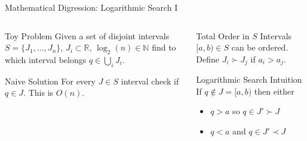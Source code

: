 \documentclass[xetex]{beamer}
\begin{document}
\begin{frame}[fragile]{Mathematical Digression: Logarithmic Search I}
  \begin{center}
  \end{center}
  \begin{columns}[t]
    \begin{column}{.45\linewidth}
      \begin{block}{Toy Problem}
        Given a set of disjoint intervals $S = \{J_1, \ldots, J_n\}$, $J_i
        \subset \mathbb{R}$, $\log_2(n) \in \mathbb{N}$ find to which interval
        belongs $q \in \bigcup_i J_i$.
      \end{block}
      \begin{block}{Naive Solution}
        For every $J \in S$ interval check if $q \in J$. This is $O(n)$.
      \end{block}
    \end{column}
    \begin{column}{.55\linewidth}
      \pause
      \begin{alertblock}{Total Order in $S$}
        Intervals $[a, b) \in S$ can be ordered. Define 
        $J_i \succ J_j$ if $a_i > a_j$.
      \end{alertblock}
      \begin{block}{Logarithmic Search Intuition}
        If $q \notin J = [a,b)$ then either
        \begin{itemize}
          \item $q > a$ so $q \in J' \succ J$
          \item $q < a$ and $q \in J' \prec J$
        \end{itemize}
      \end{block}
    \end{column}
  \end{columns}
\end{frame}
\end{document}

